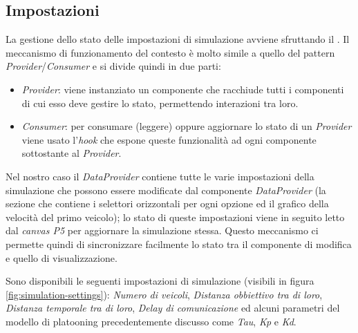 \newpage
\subsection{Impostazioni}

La gestione dello stato delle impostazioni di simulazione avviene sfruttando il . Il meccanismo di funzionamento del contesto è molto simile a quello del pattern \textit{Provider}/\textit{Consumer} e si divide quindi in due parti:
\vspace{-0.2em}
\begin{itemize}
    \item \textit{Provider}: viene instanziato un componente che racchiude tutti i componenti di cui esso deve gestire lo stato, permettendo interazioni tra loro.\vspace*{-0.5em}
    \item \textit{Consumer}: per consumare (leggere) oppure aggiornare lo stato di un \textit{Provider} viene usato l'\textit{hook}  che espone queste funzionalità ad ogni componente sottostante al \textit{Provider}.
\end{itemize}
\vspace{-0.2em}

Nel nostro caso il \textit{DataProvider} contiene tutte le varie impostazioni della simulazione che possono essere modificate dal componente \textit{DataProvider} (la sezione che contiene i selettori orizzontali per ogni opzione ed il grafico della velocità del primo veicolo); lo stato di queste impostazioni viene in seguito letto dal \textit{canvas P5} per aggiornare la simulazione stessa. Questo meccanismo ci permette quindi di sincronizzare facilmente lo stato tra il componente di modifica e quello di visualizzazione.

Sono disponibili le seguenti impostazioni di simulazione (visibili in figura \ref{fig:simulation-settings}): \textit{Numero di veicoli}, \textit{Distanza obbiettivo tra di loro}, \textit{Distanza temporale tra di loro}, \textit{Delay di comunicazione} ed alcuni parametri del modello di platooning precedentemente discusso come \textit{Tau}, \textit{Kp} e \textit{Kd}.

